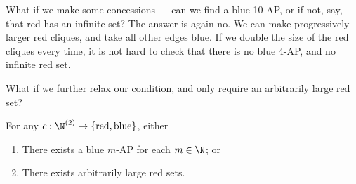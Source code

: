 \documentclass[a4paper]{article}
\begin{document}
What if we make some concessions --- can we find a blue 10-AP, or if not, say, that red has an infinite set? The answer is again no. We can make progressively larger red cliques, and take all other edges blue. If we double the size of the red cliques every time, it is not hard to check that there is no blue 4-AP, and no infinite red set.
\begin{center}
\end{center}
What if we further relax our condition, and only require an arbitrarily large red set?
\begin{thm}
  For any $c: \N^{(2)} \to \{\mathrm{red}, \mathrm{blue}\}$, either
  \begin{enumerate}
    \item There exists a blue $m$-AP for each $m \in \N$; or
    \item There exists arbitrarily large red sets.
  \end{enumerate}
\end{thm}
\end{document}
